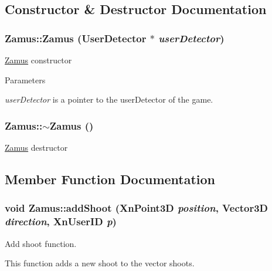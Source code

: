 \subsection{Constructor \& Destructor Documentation}
\hypertarget{classZamus_aeacafafa18573498933213b913c335bd}{
\subsubsection[{Zamus}]{\setlength{\rightskip}{0pt plus 5cm}Zamus::Zamus ({\bf UserDetector} $\ast$ {\em userDetector})}}
\label{classZamus_aeacafafa18573498933213b913c335bd}
\hyperlink{classZamus}{Zamus} constructor


\begin{DoxyParams}{Parameters}
\item[{\em userDetector}]is a pointer to the userDetector of the game. \end{DoxyParams}
\hypertarget{classZamus_a0f7b461022280659da44d83157c6572f}{
\subsubsection[{$\sim$Zamus}]{\setlength{\rightskip}{0pt plus 5cm}Zamus::$\sim$Zamus ()}}
\label{classZamus_a0f7b461022280659da44d83157c6572f}
\hyperlink{classZamus}{Zamus} destructor 

\subsection{Member Function Documentation}
\hypertarget{classZamus_a2b78080cf5fa4896c66c7bbdb1d4df90}{
\subsubsection[{addShoot}]{\setlength{\rightskip}{0pt plus 5cm}void Zamus::addShoot (XnPoint3D {\em position}, \/  {\bf Vector3D} {\em direction}, \/  XnUserID {\em p})}}
\label{classZamus_a2b78080cf5fa4896c66c7bbdb1d4df90}
Add shoot function.

This function adds a new shoot to the vector shoots.


